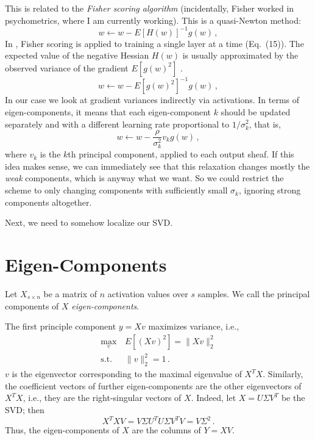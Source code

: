\documentclass[11pt]{article}
\begin{document}
This is related to the {\it Fisher scoring algorithm} \cite{fisher_scoring} (incidentally, Fisher worked in psychometrics, where I am currently working). This is a quasi-Newton method:
\begin{equation}
    w \longleftarrow w - E[H(w)]^{-1} g\left(w\right)\,,
\end{equation}
In \cite{lla}, Fisher scoring is applied to training a single layer at a time (Eq.~(15)). The expected value of the negative Hessian $H(w)$ is usually approximated by the observed variance of the gradient $E[g(w)^2]$ \cite{fisher_tutorial}.
\begin{equation}
    w \longleftarrow w - E[g(w)^2]^{-1} g\left(w\right)\,,
\end{equation}
In our case we look at gradient variances indirectly via activations. In terms of eigen-components, it means that each eigen-component $k$ should be updated separately and with a different learning rate proportional to $1/\sigma_k^2$, that is,
\begin{equation}
    w \longleftarrow w - \frac{\rho}{\sigma_k^2} v_k g\left(w\right)\,,
    \label{fisher}
\end{equation}
where $v_k$ is the $k$th principal component, applied to each output sheaf. If this idea makes sense, we can immediately see that this relaxation changes mostly the {\it weak} components, which is anyway what we want. So we could restrict the scheme to only changing components with sufficiently small $\sigma_k$, ignoring strong components altogether. 

Next, we need to somehow localize our SVD.

\newpage

\appendix

\section{Eigen-Components}
\label{sec:pc}
Let $X_{s \times n}$ be a matrix of $n$ activation values over $s$ samples. We call the principal components of $X$ {\it eigen-components}.

The first principle component $y = X v$ maximizes variance, i.e., 
\begin{equation}
    \begin{aligned}
       \max_v\, & E[(X v)^2] = \|X v\|^2_2 \\
        \text{s.t.}\, & \|v\|^2_2 = 1\,.
    \end{aligned}
\end{equation}
$v$ is the eigenvector corresponding to the maximal eigenvalue of $X^T X$. Similarly, the coefficient vectors of further eigen-components are the other eigenvectors of $X^T X$, i.e., they are the right-singular vectors of $X$. Indeed, let $X = U \Sigma V^T$ be the SVD; then
\begin{equation}
    X^T X V = V \Sigma U^T U \Sigma V^T V = V \Sigma^2\,.
\end{equation}
Thus, the eigen-components of $X$ are the columns of $Y = X V$.
\end{document}
